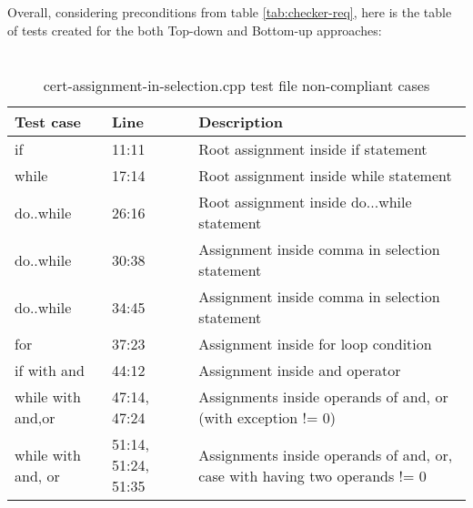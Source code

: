 Overall, considering preconditions from table \ref{tab:checker-req}, here is the table of tests created for the both Top-down and Bottom-up approaches:

\begin{table}[H]
    \centering
    \begin{tabular}{|m{}|m{}|m{}|}
        \hline
        \textbf{Test case} & \textbf{Line} & \textbf{Description}  \\
        \hline
        if & 11:11  & Root assignment inside if statement \\
        \hline
        while & 17:14  & Root assignment inside while statement \\
        \hline
        do..while & 26:16  & Root assignment inside do...while statement \\
        \hline
        do..while & 30:38  & Assignment inside comma in selection statement \\
        \hline
        do..while & 34:45  & Assignment inside comma in selection statement \\
        \hline
        for & 37:23  & Assignment inside for loop condition \\
        \hline
        if with and & 44:12  & Assignment inside and operator   \\
        \hline
        while with and,or & 47:14, 47:24  & Assignments inside operands of and, or (with exception != 0) \\
        \hline
        while with and, or & 51:14, 51:24, 51:35  &   Assignments inside operands of and, or, case with having two operands != 0  \\ 
        \hline
    \end{tabular}
    \caption{\\cert-assignment-in-selection.cpp test file non-compliant cases}
    \label{tab:test-lit-1}
\end{table}

